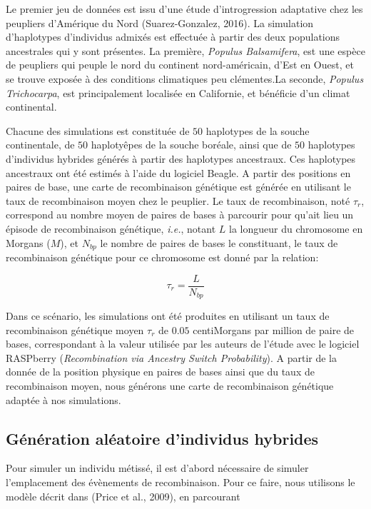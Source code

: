 \documentclass[12pt,twoside]{reedthesis}
\begin{document}
  Le premier jeu de données est issu d'une étude d'introgression
  adaptative chez les peupliers d'Amérique du Nord (Suarez-Gonzalez,
  2016). La simulation d'haplotypes d'individus admixés est effectuée à
  partir des deux populations ancestrales qui y sont présentes. La
  première, \emph{Populus Balsamifera}, est une espèce de peupliers qui
  peuple le nord du continent nord-américain, d'Est en Ouest, et se trouve
  exposée à des conditions climatiques peu clémentes.La seconde,
  \emph{Populus Trichocarpa}, est principalement localisée en Californie,
  et bénéficie d'un climat continental.
  
  Chacune des simulations est constituée de \(50\) haplotypes de la souche
  continentale, de \(50\) haplotyêpes de la souche boréale, ainsi que de
  \(50\) haplotypes d'individus hybrides générés à partir des haplotypes
  ancestraux. Ces haplotypes ancestraux ont été estimés à l'aide du
  logiciel Beagle. A partir des positions en paires de base, une carte de
  recombinaison génétique est générée en utilisant le taux de
  recombinaison moyen chez le peuplier. Le taux de recombinaison, noté
  \(\tau_r\), correspond au nombre moyen de paires de bases à parcourir
  pour qu'ait lieu un épisode de recombinaison génétique, \emph{i.e.},
  notant \(L\) la longueur du chromosome en Morgans (\(M\)), et \(N_{bp}\)
  le nombre de paires de bases le constituant, le taux de recombinaison
  génétique pour ce chromosome est donné par la relation:
  
  \[\tau_r = \frac{L}{N_{bp}}\]
  
  Dans ce scénario, les simulations ont été produites en utilisant un taux
  de recombinaison génétique moyen \(\tau_r\) de \(0.05\) centiMorgans par
  million de paire de bases, correspondant à la valeur utilisée par les
  auteurs de l'étude avec le logiciel RASPberry
  (\textit{Recombination via Ancestry Switch Probability}). A partir de la
  donnée de la position physique en paires de bases ainsi que du taux de
  recombinaison moyen, nous générons une carte de recombinaison génétique
  adaptée à nos simulations.
  
  \subsection{Génération aléatoire d'individus
  hybrides}\label{generation-aleatoire-dindividus-hybrides}
  
  Pour simuler un individu métissé, il est d'abord nécessaire de simuler
  l'emplacement des évènements de recombinaison. Pour ce faire, nous
  utilisons le modèle décrit dans (Price et al., 2009), en parcourant
  
\end{document}
